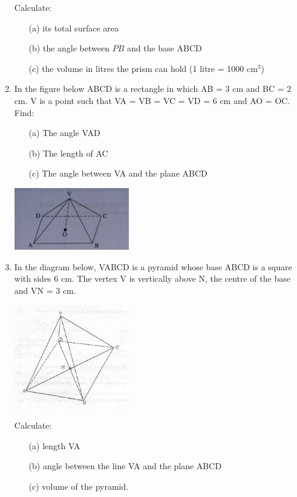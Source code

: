 \begin{enumerate}
	Calculate:
	\begin{itemize}
	\item[(a)] its total surface area
	\item[(b)] the angle between $\overline{PB}$ and the base ABCD
	\item[(c)] the volume in litres the prism can hold (1 litre = 1000 cm$^3$)
	\end{itemize}
	
	\item In the figure below ABCD is a rectangle in which AB = 3 cm and BC = 2 cm. V is a point such that VA = VB = VC = VD = 6 cm and AO = OC. Find:
		\begin{itemize}
		\item[(a)] The angle VAD
		\item[(b)] The length of AC
		\item[(c)] The angle between VA and the plane ABCD
		\end{itemize}
	\begin{center}
	\includegraphics[width=5cm]{./img/3d4.jpg}
	\end{center}

	\item In the diagram below, VABCD is a pyramid whose base ABCD is a square with sides 6 cm. The vertex V is vertically above N, the centre of the base and VN = 3 cm.
	\begin{center}
	\includegraphics[width=5cm]{./img/3d5.jpg}
	\end{center}
	Calculate:
	\begin{itemize}
	\item[(a)] length VA
	\item[(b)] angle between the line VA and the plane ABCD
	\item[(c)] volume of the pyramid.
	\end{itemize}
	

\end{enumerate}
